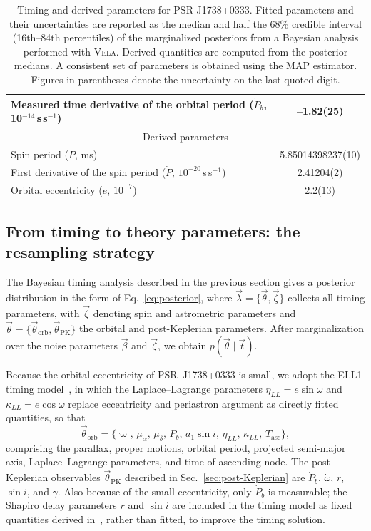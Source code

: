 \documentclass[
    floats,
    floatfix,
    amssymb,
    prd,
    twocolumn,
    superscriptaddress,
    nofootinbib,
    unicode,
    colorlinks=true,
    linktocpage=true
]{revtex4-2}
\begin{document}
\begin{table}[t]
\begin{tabular}{lc}
Measured time derivative of the orbital period ($\dot{P}_b$, 10$^{-14}$\,s\,s$^{-1}$) & --1.82(25) \\
\hline
\multicolumn{2}{c}{Derived parameters} \\
\hline
Spin period ($P$, ms)& 5.85014398237(10) \\
First derivative of the spin period ($\dot{P}$, $10^{-20}$\,s\,s$^{-1}$) & 2.41204(2) \\
Orbital eccentricity ($e$, $10^{-7}$) & 2.2(13) \\
\hline
\hline
\end{tabular}
    \caption{Timing and derived parameters for PSR J1738+0333. Fitted parameters and their uncertainties are reported as the median and half the 68\%
credible interval (16th–84th percentiles) of the marginalized posteriors from a Bayesian analysis performed with \textsc{Vela}. Derived quantities are computed from the posterior medians. A consistent set of parameters is obtained using the MAP estimator. Figures in parentheses denote the uncertainty on the last quoted digit.}
    \label{tab:timing-results}
\end{table}

\subsection{From timing to theory parameters: the resampling strategy}
\label{sec:resampling}

The Bayesian timing analysis described in the previous section gives a posterior 
distribution in the form of Eq.~\eqref{eq:posterior}, where 
$\vec{\lambda}=\{\vec{\theta},\vec{\zeta}\}$ collects all timing parameters, 
with $\vec{\zeta}$ denoting spin and astrometric parameters and 
$\vec{\theta}=\{\vec{\theta}_\mathrm{orb},\vec{\theta}_\mathrm{PK}\}$ the orbital 
and post-Keplerian parameters. After marginalization over the noise parameters 
$\vec{\beta}$ and $\vec{\zeta}$, we obtain $p(\vec{\theta}\mid\vec{t})$. 

Because 
the orbital eccentricity of PSR~J1738+0333 is small, we adopt the ELL1 timing 
model~\cite{Lange:2001rn}, in which the Laplace--Lagrange parameters 
$\eta_{LL} = e\sin\omega$ and $\kappa_{LL} = e\cos\omega$ replace eccentricity and periastron 
argument as directly fitted quantities, so that
\begin{equation*}
\vec{\theta}_\mathrm{orb} = \{\varpi,\,\mu_\alpha,\,\mu_\delta,\,P_b,\,a_1\sin i,\,\eta_{LL},\,\kappa_{LL},\,T_\mathrm{asc}\},
\end{equation*}
comprising the parallax, proper motions, orbital period, projected semi-major axis, 
Laplace--Lagrange parameters, and time of ascending node. The post-Keplerian observables $\vec{\theta}_\mathrm{PK}$ described in 
Sec.~\ref{sec:post-Keplerian} are $\dot{P}_b$, $\dot{\omega}$, $r$, $\sin i$, and 
$\gamma$. Also because of the small eccentricity, only $\dot{P}_b$ is measurable; 
the Shapiro delay parameters $r$ and $\sin i$ are included in the timing model as 
fixed quantities derived in~\cite{Antoniadis:2012vy}, rather than fitted, to improve 
the timing solution.
\end{document}
